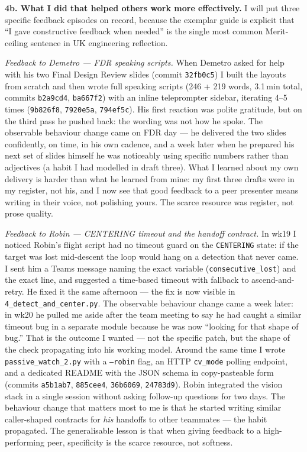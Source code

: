 \textbf{4b. What I did that helped others work more effectively.} I will put three specific feedback episodes on record, because the exemplar guide is explicit that ``I gave constructive feedback when needed'' is the single most common Merit-ceiling sentence in UK engineering reflection.

\textit{Feedback to Demetro --- FDR speaking scripts.} When Demetro asked for help with his two Final Design Review slides (commit \texttt{32fb0c5}) I built the layouts from scratch and then wrote full speaking scripts (246 + 219 words, 3.1\,min total, commits \texttt{b2a9cd4}, \texttt{ba667f2}) with an inline teleprompter sidebar, iterating 4--5 times (\texttt{9b826f8}, \texttt{7920e5a}, \texttt{794ef5c}). His first reaction was polite gratitude, but on the third pass he pushed back: the wording was not how he spoke. The observable behaviour change came on FDR day --- he delivered the two slides confidently, on time, in his own cadence, and a week later when he prepared his next set of slides himself he was noticeably using specific numbers rather than adjectives (a habit I had modelled in draft three). What I learned about my own delivery is harder than what he learned from mine: my first three drafts were in my register, not his, and I now see that good feedback to a peer presenter means writing in their voice, not polishing yours. The scarce resource was register, not prose quality.

\textit{Feedback to Robin --- CENTERING timeout and the handoff contract.} In wk19 I noticed Robin's flight script had no timeout guard on the \texttt{CENTERING} state: if the target was lost mid-descent the loop would hang on a detection that never came. I sent him a Teams message naming the exact variable (\texttt{consecutive\_lost}) and the exact line, and suggested a time-based timeout with fallback to ascend-and-retry. He fixed it the same afternoon --- the fix is now visible in \texttt{4\_detect\_and\_center.py}. The observable behaviour change came a week later: in wk20 he pulled me aside after the team meeting to say he had caught a similar timeout bug in a separate module because he was now ``looking for that shape of bug.'' That is the outcome I wanted --- not the specific patch, but the shape of the check propagating into his working model. Around the same time I wrote \texttt{passive\_watch\_2.py} with a \texttt{--robin} flag, an HTTP \texttt{cv\_mode} polling endpoint, and a dedicated README with the JSON schema in copy-pasteable form (commits \texttt{a5b1ab7}, \texttt{885cee4}, \texttt{36b6069}, \texttt{24783d9}). Robin integrated the vision stack in a single session without asking follow-up questions for two days. The behaviour change that matters most to me is that he started writing similar caller-shaped contracts for \emph{his} handoffs to other teammates --- the habit propagated. The generalisable lesson is that when giving feedback to a high-performing peer, specificity is the scarce resource, not softness.

